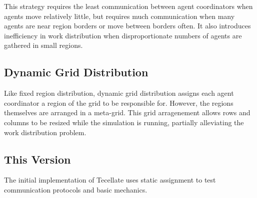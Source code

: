 This strategy requires the least communication between agent coordinators when agents move relatively little, but requires much communication when many agents are near region borders or move between borders often. It also introduces inefficiency in work distribution when disproportionate numbers of agents are gathered in small regions.

\subsection{Dynamic Grid Distribution}

Like fixed region distribution, dynamic grid distribution assigns each agent coordinator a region of the grid to be responsible for. However, the regions themselves are arranged in a meta-grid. This grid arragenement allows rows and columns to be resized while the simulation is running, partially alleviating the work distribution problem.

\subsection{This Version}

The initial implementation of Tecellate uses static assignment to test communication protocols and basic mechanics. 
